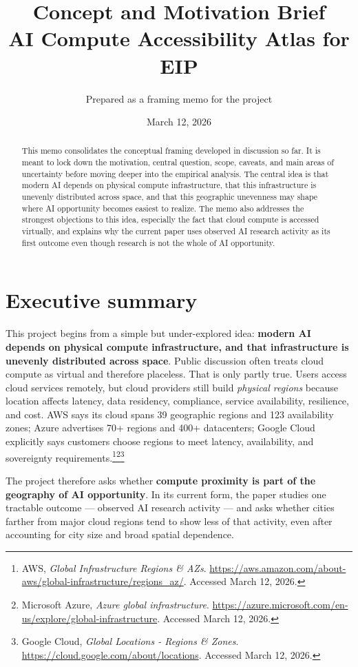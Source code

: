 \documentclass[11pt]{article}
\title{\textbf{Concept and Motivation Brief}\\
\large AI Compute Accessibility Atlas for EIP}
\author{Prepared as a framing memo for the project}
\date{March 12, 2026}
\begin{document}
\maketitle

\begin{abstract}
This memo consolidates the conceptual framing developed in discussion so far. It is meant to lock down the motivation, central question, scope, caveats, and main areas of uncertainty before moving deeper into the empirical analysis. The central idea is that modern AI depends on physical compute infrastructure, that this infrastructure is unevenly distributed across space, and that this geographic unevenness may shape where AI opportunity becomes easiest to realize. The memo also addresses the strongest objections to this idea, especially the fact that cloud compute is accessed virtually, and explains why the current paper uses observed AI research activity as its first outcome even though research is not the whole of AI opportunity.
\end{abstract}

\section{Executive summary}

This project begins from a simple but under-explored idea: \textbf{modern AI depends on physical compute infrastructure, and that infrastructure is unevenly distributed across space}. Public discussion often treats cloud compute as virtual and therefore placeless. That is only partly true. Users access cloud services remotely, but cloud providers still build \emph{physical regions} because location affects latency, data residency, compliance, service availability, resilience, and cost. AWS says its cloud spans 39 geographic regions and 123 availability zones; Azure advertises 70+ regions and 400+ datacenters; Google Cloud explicitly says customers choose regions to meet latency, availability, and sovereignty requirements.\footnote{AWS, \emph{Global Infrastructure Regions \& AZs}. \url{https://aws.amazon.com/about-aws/global-infrastructure/regions_az/}. Accessed March 12, 2026.}\footnote{Microsoft Azure, \emph{Azure global infrastructure}. \url{https://azure.microsoft.com/en-us/explore/global-infrastructure}. Accessed March 12, 2026.}\footnote{Google Cloud, \emph{Global Locations - Regions \& Zones}. \url{https://cloud.google.com/about/locations}. Accessed March 12, 2026.}

The project therefore asks whether \textbf{compute proximity is part of the geography of AI opportunity}. In its current form, the paper studies one tractable outcome --- observed AI research activity --- and asks whether cities farther from major cloud regions tend to show less of that activity, even after accounting for city size and broad spatial dependence.
\end{document}
